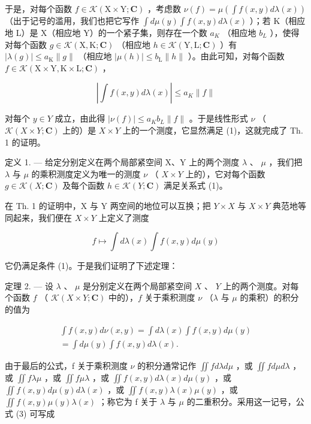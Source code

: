 于是，对每个函数 \(f \in \mathcal{K}(\mathrm{X} \times \mathrm{Y}; \mathbf{C})\) ，考虑数 \(\nu(f) = \mu\left(\int f(x, y) d\lambda(x)\right)\) （出于记号的滥用，我们也把它写作 \(\int d\mu(y) \int f(x, y) d\lambda(x)\) ）；若 K（相应地 L）是 X（相应地 Y）的一个紧子集，则存在一个数 \(a_{K}\) （相应地 \(b_{L}\) ），使得对每个函数 \(g \in \mathcal{K}(\mathrm{X}, \mathrm{K}; \mathbf{C})\) （相应地 \(h \in \mathcal{K}(\mathrm{Y}, \mathrm{L}; \mathbf{C})\) ）有 \(|\lambda(g)| \leqslant a_{\mathrm{K}} \|g\|\) （相应地 \(|\mu(h)| \leqslant b_{\mathrm{L}} \|h\|\) ）。由此可知，对每个函数 \(f \in \mathcal{K}(\mathrm{X} \times \mathrm{Y}, \mathrm{K} \times \mathrm{L}; \mathbf{C})\) ，

\[
\left| \int f (x, y) d \lambda (x) \right| \leqslant a _ {K} \| f \|
\]

对每个 \(y \in Y\) 成立，由此得 \(|\nu(f)| \leqslant a_{K}b_{L}\|f\|\) 。于是线性形式 \(\nu\) （ \(\mathcal{K}(X \times Y; \mathbf{C})\) 上的）是 \(X \times Y\) 上的一个测度，它显然满足 (1)，这就完成了 Th. 1 的证明。

定义 1. --- 给定分别定义在两个局部紧空间 X、Y 上的两个测度 \(\lambda\) 、 \(\mu\) ，我们把 \(\lambda\) 与 \(\mu\) 的乘积测度定义为唯一的测度 \(\nu\) （ \(X \times Y\) 上的），它对每个函数 \(g \in \mathcal{K}(X; \mathbf{C})\) 及每个函数 \(h \in \mathcal{K}(Y; \mathbf{C})\) 满足关系式 (1)。

在 Th. 1 的证明中，X 与 Y 两空间的地位可以互换；把 \(Y \times X\) 与 \(X \times Y\) 典范地等同起来，我们便在 \(X \times Y\) 上定义了测度

\[
f \mapsto \int d \lambda (x) \int f (x, y) d \mu (y)
\]

它仍满足条件 (1)。于是我们证明了下述定理：

定理 2. --- 设 \(\lambda\) 、 \(\mu\) 是分别定义在两个局部紧空间 \(X\) 、 \(Y\) 上的两个测度。对每个函数 \(f\) （ \(\mathcal{K}(X \times Y; \mathbf{C})\) 中的），\(f\) 关于乘积测度 \(\nu\) （\(\lambda\) 与 \(\mu\) 的乘积）的积分的值为

\[
\begin{array}{c} \int f (x, y) d \nu (x, y) = \int d \lambda (x) \int f (x, y) d \mu (y) \\ = \int d \mu (y) \int f (x, y) d \lambda (x). \end{array}\tag{3}
\]

由于最后的公式，f 关于乘积测度 \(\nu\) 的积分通常记作 \(\iint f d\lambda d\mu\) ，或 \(\iint f d\mu d\lambda\) ，或 \(\iint f \lambda \mu\) ，或 \(\iint f \mu \lambda\) ，或 \(\iint f(x, y) d\lambda(x) d\mu(y)\) ，或 \(\iint f(x, y) d\mu(y) d\lambda(x)\) ，或 \(\iint f(x, y) \lambda(x)\mu(y)\) ，或 \(\iint f(x, y) \mu(y)\lambda(x)\) ；称它为 f 关于 \(\lambda\) 与 \(\mu\) 的二重积分。采用这一记号，公式 (3) 可写成

